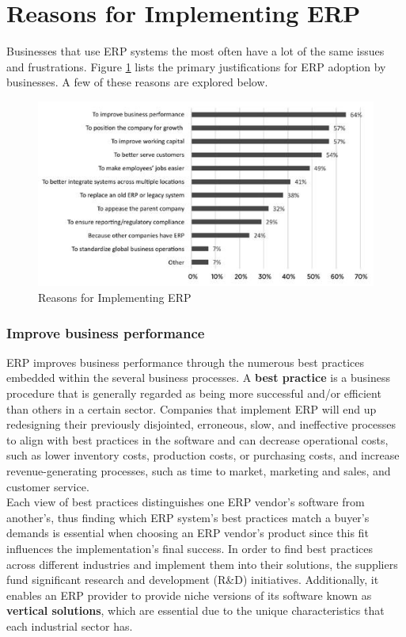 \section{Reasons for Implementing ERP}
Businesses that use ERP systems the most often have a lot of the same issues and frustrations. Figure \ref{fig:2_ERP_Reasons} lists the primary justifications for ERP adoption by businesses. A few of these reasons are explored below.

\begin{figure}
    \centering
    \includegraphics[scale=0.75]{Pictures/2_ERP_Reasons.jpg}
    \caption{Reasons for Implementing ERP}
    \label{fig:2_ERP_Reasons}
\end{figure}

\subsubsection{Improve business performance}
ERP improves business performance through the numerous best practices embedded within the several business processes. A \textbf{best practice} is a business procedure that is generally regarded as being more successful and/or efficient than others in a certain sector.
Companies that implement ERP will end up redesigning their previously disjointed, erroneous, slow, and ineffective processes to align with best practices in the software and can decrease operational costs, such as lower inventory costs, production costs, or purchasing costs, and increase revenue-generating processes, such as time to market, marketing and sales, and customer service.\\
Each view of best practices distinguishes one ERP vendor’s software from another’s, thus finding which ERP system's best practices match a buyer's demands is essential when choosing an ERP vendor's product since this fit influences the implementation's final success.
In order to find best practices across different industries and implement them into their solutions, the suppliers fund significant research and development (R\&D) initiatives. Additionally, it enables an ERP provider to provide niche versions of its software known as \textbf{vertical solutions}, which are essential due to the unique characteristics that each industrial sector has.

